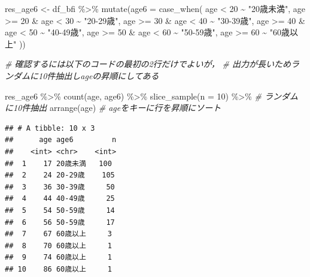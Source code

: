 \documentclass[
  xelatex,ja=standard, b5paper]{bxjsbook}
\newenvironment{Shaded}{\begin{snugshade}}{\end{snugshade}}
\newcommand{\AttributeTok}[1]{\textcolor[rgb]{0.77,0.63,0.00}{#1}}
\newcommand{\CommentTok}[1]{\textcolor[rgb]{0.56,0.35,0.01}{\textit{#1}}}
\newcommand{\DecValTok}[1]{\textcolor[rgb]{0.00,0.00,0.81}{#1}}
\newcommand{\FunctionTok}[1]{\textcolor[rgb]{0.00,0.00,0.00}{#1}}
\newcommand{\NormalTok}[1]{#1}
\newcommand{\OtherTok}[1]{\textcolor[rgb]{0.56,0.35,0.01}{#1}}
\newcommand{\SpecialCharTok}[1]{\textcolor[rgb]{0.00,0.00,0.00}{#1}}
\newcommand{\StringTok}[1]{\textcolor[rgb]{0.31,0.60,0.02}{#1}}
\begin{document}
\begin{Shaded}
\begin{Highlighting}[]
\NormalTok{res\_age6 }\OtherTok{\textless{}{-}} 
\NormalTok{  df\_bfi }\SpecialCharTok{\%\textgreater{}\%} 
  \FunctionTok{mutate}\NormalTok{(}\AttributeTok{age6 =} \FunctionTok{case\_when}\NormalTok{(}
\NormalTok{    age }\SpecialCharTok{\textless{}} \DecValTok{20}              \SpecialCharTok{\textasciitilde{}} \StringTok{"20歳未満"}\NormalTok{, }
\NormalTok{    age }\SpecialCharTok{\textgreater{}=} \DecValTok{20}  \SpecialCharTok{\&}\NormalTok{ age }\SpecialCharTok{\textless{}} \DecValTok{30} \SpecialCharTok{\textasciitilde{}} \StringTok{"20{-}29歳"}\NormalTok{, }
\NormalTok{    age }\SpecialCharTok{\textgreater{}=} \DecValTok{30}  \SpecialCharTok{\&}\NormalTok{ age }\SpecialCharTok{\textless{}} \DecValTok{40} \SpecialCharTok{\textasciitilde{}} \StringTok{"30{-}39歳"}\NormalTok{,}
\NormalTok{    age }\SpecialCharTok{\textgreater{}=} \DecValTok{40}  \SpecialCharTok{\&}\NormalTok{ age }\SpecialCharTok{\textless{}} \DecValTok{50} \SpecialCharTok{\textasciitilde{}} \StringTok{"40{-}49歳"}\NormalTok{,}
\NormalTok{    age }\SpecialCharTok{\textgreater{}=} \DecValTok{50}  \SpecialCharTok{\&}\NormalTok{ age }\SpecialCharTok{\textless{}} \DecValTok{60} \SpecialCharTok{\textasciitilde{}} \StringTok{"50{-}59歳"}\NormalTok{,}
\NormalTok{    age }\SpecialCharTok{\textgreater{}=} \DecValTok{60}             \SpecialCharTok{\textasciitilde{}} \StringTok{"60歳以上"}  
\NormalTok{  ))}

\CommentTok{\# 確認するには以下のコードの最初の2行だけでよいが，}
\CommentTok{\# 出力が長いためランダムに10件抽出しageの昇順にしてある}

\NormalTok{res\_age6 }\SpecialCharTok{\%\textgreater{}\%} 
  \FunctionTok{count}\NormalTok{(age, age6) }\SpecialCharTok{\%\textgreater{}\%} 
  \FunctionTok{slice\_sample}\NormalTok{(}\AttributeTok{n =} \DecValTok{10}\NormalTok{) }\SpecialCharTok{\%\textgreater{}\%} \CommentTok{\# ランダムに10件抽出}
  \FunctionTok{arrange}\NormalTok{(age)             }\CommentTok{\# ageをキーに行を昇順にソート}
\end{Highlighting}
\end{Shaded}

\begin{verbatim}
## # A tibble: 10 x 3
##      age age6         n
##    <int> <chr>    <int>
##  1    17 20歳未満   100
##  2    24 20-29歳    105
##  3    36 30-39歳     50
##  4    44 40-49歳     25
##  5    54 50-59歳     14
##  6    56 50-59歳     17
##  7    67 60歳以上     3
##  8    70 60歳以上     1
##  9    74 60歳以上     1
## 10    86 60歳以上     1
\end{verbatim}
\end{document}
